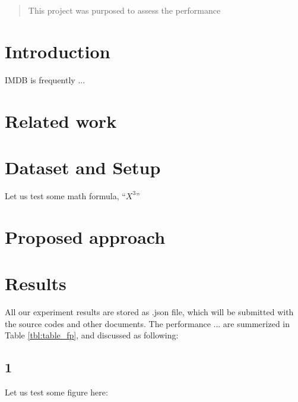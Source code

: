 \documentclass[letterpaper, 11pt]{article}
\begin{document}

\clearpage
\setcounter{page}{2}

\singlespacing

\begin{abstract}
This project was purposed to assess the performance 

\end{abstract}

\section*{Introduction}

IMDB  is frequently ...



\section*{Related work}



\section*{Dataset and Setup}

Let us test some math formula, ``$X^{3}$''

\section*{Proposed approach}



\section*{Results}

All our experiment results are stored as .json file, which will be submitted with the source codes and other documents. The performance ... are summerized in Table \ref{tbl:table_fp}, and discussed as following:

\subsection*{1}

Let us test some figure here:
\end{document}
